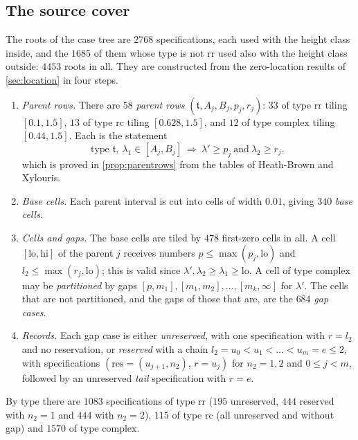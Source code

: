 \documentclass[11pt]{amsart}
\numberwithin{equation}{section}
\theoremstyle{plain}
\theoremstyle{definition}
\theoremstyle{remark}
\newcommand{\lo}{\mathrm{lo}}
\newcommand{\hi}{\mathrm{hi}}
\newcommand{\1}{\mathbf{1}}
\begin{document}
\subsection{The source cover}\label{subsec:sourcecover}
The roots of the case tree are $2768$ specifications, each used with the height class
$\mathrm{inside}$, and the $1685$ of them whose type is not $\mathrm{rr}$ used also with the height
class $\mathrm{outside}$: $4453$ roots in all. They are constructed from the zero-location results of
\cref{sec:location} in four steps.
\begin{enumerate}[(1)]
  \item \emph{Parent rows.} There are $58$ \emph{parent rows} $(\mathfrak t,A_j,B_j,p_j,r_j)$: $33$ of type
    $\mathrm{rr}$ tiling $[0.1,1.5]$, $13$ of type $\mathrm{rc}$ tiling $[0.628,1.5]$, and $12$ of type
    $\mathrm{complex}$ tiling $[0.44,1.5]$. Each is the statement
    \begin{equation}\tag{T2}\label{eq:T2}
      \text{type }\mathfrak t,\ \lambda_1\in[A_j,B_j]\ \Longrightarrow\ \lambda'\ge p_j\ \text{and}\ \lambda_2\ge r_j,
    \end{equation}
    which is proved in \cref{prop:parentrows} from the tables of Heath-Brown and Xylouris.
  \item \emph{Base cells.} Each parent interval is cut into cells of width $0.01$, giving $340$
    \emph{base cells}.
  \item \emph{Cells and gaps.} The base cells are tiled by $478$ first-zero cells in all. A cell
    $[\lo,\hi]$ of the parent $j$ receives numbers $p\le\max(p_j,\lo)$ and $l_2\le\max(r_j,\lo)$; this is
    valid since $\lambda',\lambda_2\ge\lambda_1\ge\lo$. A cell of type
    $\mathrm{complex}$ may be \emph{partitioned} by gaps $[p,m_1],[m_1,m_2],\dots,[m_k,\infty]$ for
    $\lambda'$. The cells that are not partitioned, and the gaps of those that are, are the $684$
    \emph{gap cases}.
  \item \emph{Records.} Each gap case is either \emph{unreserved}, with one specification with
    $r=l_2$ and no reservation, or \emph{reserved} with a chain $l_2=u_0<u_1<\dots<u_m=e\le2$,
    with specifications $(\mathrm{res}=(u_{j+1},n_2),\,r=u_j)$ for $n_2=1,2$ and $0\le j<m$,
    followed by an unreserved \emph{tail} specification with $r=e$.
\end{enumerate}
By type there are $1083$ specifications of type $\mathrm{rr}$ ($195$ unreserved, $444$ reserved
with $n_2=1$ and $444$ with $n_2=2$), $115$ of type $\mathrm{rc}$ (all unreserved and without gap)
and $1570$ of type $\mathrm{complex}$.
\end{document}
